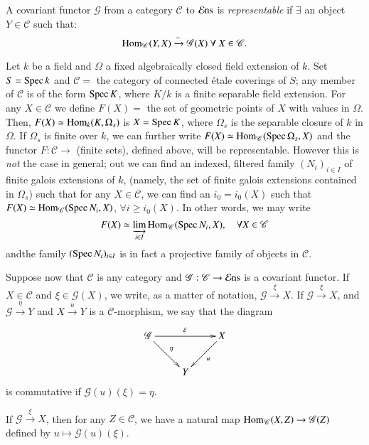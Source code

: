 \begin{defin}\label{chap4-defi4.3.1}
A covariant functor $\mathscr{G}$ from a category $\mathscr{C}$ to
$\operatorname{\mathcal{E}ns}$ is {\em representable} if $\exists$ an object
$Y\in\mathscr{C}$ such that:
$$
\Hom_{\mathscr{C}}(Y,X)\xrightarrow{\sim}\mathscr{G}(X)\ \forall\
X\in\mathscr{C}.
$$
\end{defin}

\begin{exam}\label{chap4-exam2}
Let $k$ be a field and $\Omega$ a fixed algebraically closed field
extension of $k$. Set $S=\operatorname{Spec} k$ and $\mathscr{C}=$ the category of
connected \'etale coverings of $S$; any member of $\mathscr{C}$ is of
the form $\operatorname{Spec} K$, where $K/k$ is a finite separable field
extension. For any $X\in\mathscr{C}$ we define $F(X)=$ the set of
geometric points of $X$ with values in $\Omega$. Then, $F(X)\simeq
\operatorname{Hom}_{k}(K,\Omega_{s})$ is $X=\operatorname{Spec} K$, where $\Omega_{s}$ is the
separable closure of $k$ in $\Omega$. If $\Omega_{s}$ is finite over
$k$, we can further write $F(X)\simeq \operatorname{Hom}_{\mathscr{C}}(\operatorname{Spec}
\Omega_{s},X)$ and the functor $F:\mathscr{C}\to$ (finite sets),
defined above, will be representable. However this is {\em not} the
case in general; out we can find an indexed, filtered family
$(N_{i})_{i\in I}$ of finite galois extensions of $k$, (namely, the
set of finite galois extensions contained in $\Omega_{s}$) such that
for any $X\in\mathscr{C}$, we can find an $i_{0}=i_{0}(X)$ such that
$F(X)\simeq \operatorname{Hom}_{\mathscr{C}}(\operatorname{Spec} N_{i},X)$, $\forall i\geq
i_{0}(X)$. In other words, we may write
$$
F(X)\simeq \varinjlim_{i\in I} \operatorname{Hom}_{\mathscr{C}}(\operatorname{Spec}
  N_{i},X),\quad \forall X\in \mathscr{C}
$$
and\pageoriginale the family $(\operatorname{Spec} N_{i})_{i\in I}$ is in fact a
projective family of objects in $\mathscr{C}$.
\end{exam}

Suppose now that $\mathscr{C}$ is any category and
$\mathscr{G}:\mathscr{C}\to \operatorname{\mathcal{E}ns}$ is a covariant functor. If $X\in
\mathscr{C}$ and $\xi\in \mathscr{G}(X)$, we write, as a matter of
notation, $\mathscr{G}\xrightarrow{\xi}X$. If
$\mathscr{G}\xrightarrow{\xi}X$, and $\mathscr{G}\xrightarrow{\eta}Y$
and $X\xrightarrow{u}Y$ is a $\mathscr{C}$-morphism, we say that the
diagram
\[
\xymatrix{
\mathscr{G}\ar[rr]^{\xi}\ar[dr]^{\eta} && X\ar[dl]^{u}\\
 & Y &
}
\]
is commutative if $\mathscr{G}(u)(\xi)=\eta$.

If $\mathscr{G}\xrightarrow{\xi}X$, then for any $Z\in\mathscr{C}$, we
have a natural map $\Hom_{\mathscr{C}}(X,Z)\break \to \mathscr{G}(Z)$ defined
by $u\mapsto \mathscr{G}(u)(\xi)$. 

